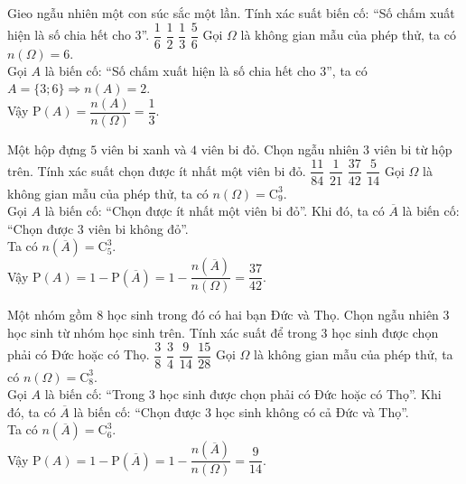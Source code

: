 \begin{ex}%
	Gieo ngẫu nhiên một con súc sắc một lần. Tính xác suất biến cố: ``Số chấm xuất hiện là số chia hết cho 3''.
		\choice
	{$\dfrac{1}{6}$}
	{$\dfrac{1}{2}$}
	{\True$\dfrac{1}{3}$}
	{$\dfrac{5}{6}$}
	\loigiai
	{ Gọi $\Omega$ là không gian mẫu của phép thử, ta có $n(\Omega)=6.$\\
		Gọi $A$ là biến cố: ``Số chấm xuất hiện là số chia hết cho $3$'', ta có $A=\{3;6\} \Rightarrow n(A)=2$.\\
		Vậy $\mathrm {P}(A)=\dfrac{n(A)}{n(\Omega)}=\dfrac{1}{3}.$
	}
\end{ex}

\begin{ex}%
	Một hộp đựng $5$ viên bi xanh và $4$ viên bi đỏ. Chọn ngẫu nhiên $3$ viên bi từ hộp trên. Tính xác suất chọn được ít nhất một viên bi đỏ.
		\choice
	{$\dfrac{11}{84}$}
	{$\dfrac{1}{21}$}
	{\True $\dfrac{37}{42}$}
	{$\dfrac{5}{14}$}
	\loigiai
	{ Gọi $\Omega$ là không gian mẫu của phép thử, ta có $n(\Omega)=\mathrm{C}_9^3.$\\
		Gọi $A$ là biến cố: ``Chọn được ít nhất một viên bi đỏ''. Khi đó, ta có $\overline{A}$ là biến cố: ``Chọn được $3$ viên bi không đỏ''.\\
		Ta có $n(\overline{A})=\mathrm{C}_5^3$.\\
		Vậy $\mathrm {P}(A)=1-\mathrm {P}(\overline{A})=1-\dfrac{n(\overline{A})}{n(\Omega)}=\dfrac{37}{42}.$
	}
\end{ex}

\begin{ex}%
	Một nhóm gồm $8$ học sinh trong đó có hai bạn Đức và Thọ. Chọn ngẫu nhiên $3$ học sinh từ nhóm học sinh trên. Tính xác suất để trong $3$ học sinh được chọn phải có Đức hoặc có Thọ.
		\choice
	{$\dfrac{3}{8}$}
	{$\dfrac{3}{4}$}
	{\True $\dfrac{9}{14}$}
	{$\dfrac{15}{28}$}
	\loigiai
	{Gọi $\Omega$ là không gian mẫu của phép thử, ta có $n(\Omega)=\mathrm{C}_8^3.$\\
		Gọi $A$ là biến cố: ``Trong $3$ học sinh được chọn phải có Đức hoặc có Thọ''. Khi đó, ta có $\overline{A}$ là biến cố: ``Chọn được $3$ học sinh không có cả Đức và Thọ''.\\
		Ta có $n(\overline{A})=\mathrm{C}_6^3.$\\
		Vậy $\mathrm {P}(A)=1-\mathrm {P}(\overline{A})=1-\dfrac{n(\overline{A})}{n(\Omega)}= \dfrac{9}{14}.$
	}
\end{ex}

